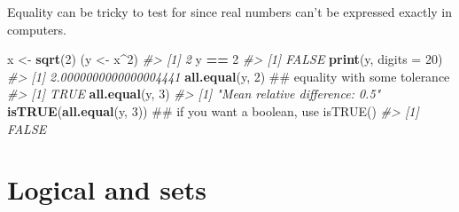 \documentclass[]{book}
\newenvironment{Shaded}{\begin{snugshade}}{\end{snugshade}}
\newcommand{\CommentTok}[1]{\textcolor[rgb]{0.56,0.35,0.01}{\textit{#1}}}
\newcommand{\DataTypeTok}[1]{\textcolor[rgb]{0.13,0.29,0.53}{#1}}
\newcommand{\DecValTok}[1]{\textcolor[rgb]{0.00,0.00,0.81}{#1}}
\newcommand{\KeywordTok}[1]{\textcolor[rgb]{0.13,0.29,0.53}{\textbf{#1}}}
\newcommand{\NormalTok}[1]{#1}
\newcommand{\OperatorTok}[1]{\textcolor[rgb]{0.81,0.36,0.00}{\textbf{#1}}}
\newcommand{\OtherTok}[1]{\textcolor[rgb]{0.56,0.35,0.01}{#1}}
\newcommand{\StringTok}[1]{\textcolor[rgb]{0.31,0.60,0.02}{#1}}
\theoremstyle{definition}
\theoremstyle{definition}
\theoremstyle{definition}
\theoremstyle{remark}
\begin{document}
Equality can be tricky to test for since real numbers can't be expressed
exactly in computers.

\begin{Shaded}
\begin{Highlighting}[]
\NormalTok{x <-}\StringTok{ }\KeywordTok{sqrt}\NormalTok{(}\DecValTok{2}\NormalTok{)}
\NormalTok{(y <-}\StringTok{ }\NormalTok{x}\OperatorTok{^}\DecValTok{2}\NormalTok{)}
\CommentTok{#> [1] 2}
\NormalTok{y }\OperatorTok{==}\StringTok{ }\DecValTok{2}
\CommentTok{#> [1] FALSE}
\KeywordTok{print}\NormalTok{(y, }\DataTypeTok{digits =} \DecValTok{20}\NormalTok{)}
\CommentTok{#> [1] 2.0000000000000004441}
\KeywordTok{all.equal}\NormalTok{(y, }\DecValTok{2}\NormalTok{)          ## equality with some tolerance}
\CommentTok{#> [1] TRUE}
\KeywordTok{all.equal}\NormalTok{(y, }\DecValTok{3}\NormalTok{)}
\CommentTok{#> [1] "Mean relative difference: 0.5"}
\KeywordTok{isTRUE}\NormalTok{(}\KeywordTok{all.equal}\NormalTok{(y, }\DecValTok{3}\NormalTok{))  ## if you want a boolean, use isTRUE()}
\CommentTok{#> [1] FALSE}
\end{Highlighting}
\end{Shaded}

\hypertarget{logical-and-sets}{%
\section{Logical and sets}\label{logical-and-sets}}

\begin{Shaded}
\end{Shaded}
\end{document}
